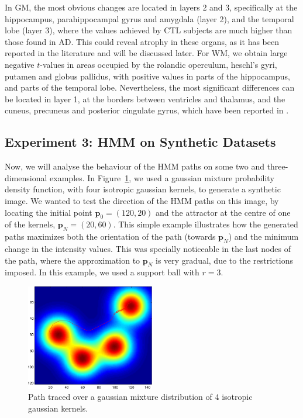 In \ac{GM}, the most obvious changes are located in layers 2 and 3, specifically at the hippocampus, parahippocampal gyrus and amygdala (layer 2), and the temporal lobe (layer 3), where the values achieved by \ac{CTL} subjects are much higher than those found in \ac{AD}. This could reveal atrophy in these organs, as it has been reported in the literature \cite{Dubois2007,Pievani2013} and will be discussed later. For \ac{WM}, we obtain large negative $t$-values in areas occupied by the rolandic operculum, heschl's gyri, putamen and globus pallidus, with positive values in parts of the hippocampus, and parts of the temporal lobe. Nevertheless, the most significant differences can be located in layer 1, at the borders between ventricles and thalamus, and the cuneus, precuneus and posterior cingulate gyrus, which have been reported in \cite{Baron2001}.

\subsection{Experiment 3: \acs{HMM} on Synthetic Datasets}

Now, we will analyse the behaviour of the \ac{HMM} paths on some two and three-dimensional examples. In Figure~\ref{fig:gaussian}, we used a gaussian mixture probability density function, with four isotropic gaussian kernels, to generate a synthetic image. We wanted to test the direction of the \ac{HMM} paths on this image, by locating the initial point $\mathbf{p}_0 = (120,20)$ and the attractor at the centre of one of the kernels, $\mathbf{p}_N = (20, 60)$. This simple example illustrates how the generated paths maximizes both the orientation of the path (towards $\mathbf{p}_N$) and the minimum change in the intensity values. This was specially noticeable in the last nodes of the path, where the approximation to $\mathbf{p}_N$ is very gradual, due to the restrictions imposed. In this example, we used a support ball with $r=3$.


\begin{figure}[p]
	\myfloatalign
		\includegraphics[width=0.5\textwidth]{Graphics/ch6/gaussian}
		\caption{Path traced over a gaussian mixture distribution of 4 i\-so\-tro\-pic gaussian kernels.}
		\label{fig:gaussian}
\end{figure}

